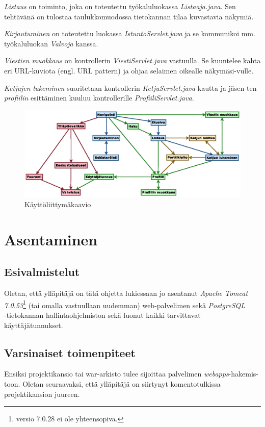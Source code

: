 \documentclass[11pt]{article}
\begin{document}
		\emph{Listaus} on toiminto, joka on toteutettu työkaluluokassa \emph{Listaaja.java}. Sen tehtävänä
		on tulostaa taulukkomuodossa tietokannan tilaa kuvastavia näkymiä.
		
		\emph{Kirjautuminen} on toteutettu luokassa \emph{IstuntoServlet.java} ja se kommunikoi mm.
		työkaluluokan \emph{Valvoja} kanssa.
		
		\emph{Viestien muokkaus} on kontrollerin \emph{ViestiServlet.java} vastuulla. Se kuuntelee kahta eri
		URL-kuviota (engl. URL pattern) ja ohjaa selaimen oikealle näkymäsi-vulle.
		
		\emph{Ketjujen lukeminen} suoritetaan kontrollerin \emph{KetjuServlet.java} kautta ja jäsen-ten
		\emph{profiilin} esittäminen kuuluu kontrollerille \emph{ProfiiliServlet.java}.
		
		\newpage
		\begin{figure}[H]		
			\includegraphics[trim = 0mm 0mm 23mm -7mm, scale = 1.5, angle = 90]{kayttoliittymakaavio.eps}
			\caption{Käyttöliittymäkaavio}
		\end{figure}
		
\newpage
\thispagestyle{plain}
	\section{Asentaminen}
		\subsection{Esivalmistelut} Oletan, että ylläpitäjä on tätä ohjetta lukiessaan jo asentanut 
		\emph{Apache Tomcat 7.0.53}\footnote{versio 7.0.28 ei ole yhteensopiva.} (tai omalla
		vastuullaan uudemman) web-palvelimen sekä \emph{PostgreSQL}\\ -tietokannan hallintaohjelmiston
		sekä luonut kaikki tarvittavat käyttäjätunnukset.
		
		\subsection{Varsinaiset toimenpiteet} Ensiksi projektikansio tai war-arkisto tulee sijoittaa
		palvelimen \emph{webapps}-hakemis-toon. Oletan seuraavaksi, että ylläpitäjä on siirtynyt
		komentotulkissa projektikansion juureen.
		
\end{document}
